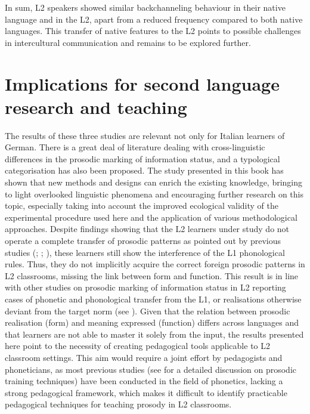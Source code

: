 In sum, L2 speakers showed similar backchanneling behaviour in their native language and in the L2, apart from a reduced frequency compared to both native languages. This transfer of native features to the L2 points to possible challenges in intercultural communication and remains to be explored further.

\section{Implications for second language research and teaching}

The results of these three studies are relevant not only for Italian learners of German. There is a great deal of literature dealing with cross-linguistic differences in the prosodic marking of information status, and a typological categorisation has also been proposed. The study presented in this book has shown that new methods and designs can enrich the existing knowledge, bringing to light overlooked linguistic phenomena and encouraging further research on this topic, especially taking into account the improved ecological validity of the experimental procedure used here and the application of various methodological approaches. Despite findings showing that the L2 learners under study do not operate a complete transfer of prosodic patterns as pointed out by previous studies (\citealt{SwertsEtAl2002}; \citealt{AvesaniEtAl2015}; \citealt{AvesaniEtAl2013}), these learners still show the interference of the L1 phonological rules. Thus, they do not implicitly acquire the correct foreign prosodic patterns in L2 classrooms, missing the link between form and function. This result is in line with other studies on prosodic marking of information status in L2 reporting cases of phonetic and phonological transfer from the L1, or realisations otherwise deviant from the target norm (see ). Given that the relation between prosodic realisation (form) and meaning expressed (function) differs across languages and that learners are not able to master it solely from the input, the results presented here point to the necessity of creating pedagogical tools applicable to L2 classroom settings. This aim would require a joint effort by pedagogists and phoneticians, as most previous studies (see  for a detailed discussion on prosodic training techniques) have been conducted in the field of phonetics, lacking a strong pedagogical framework, which makes it difficult to identify practicable pedagogical techniques for teaching prosody in L2 classrooms.


